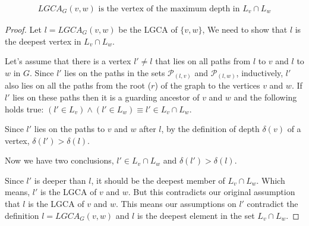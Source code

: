 \begin{theorem} \label{proofOfDeepness}
	\begin{gather*}
		LGCA_G(v,w) \text{ is the vertex of the maximum depth in } L_v\cap L_w
	\end{gather*}
\end{theorem}

\begin{proof}
	 Let $l = LGCA_G(v,w)$ be the LGCA of $\{v, w\}$, We need to show that $l$ is the deepest vertex in  $L_v \cap L_w$.


	Let's assume that there is a vertex $l' \neq l$ that lies on all paths from $l$ to $v$ and $l$ to $w$ in $G$.
	Since $l'$ lies on the paths in the sets $\mathcal{P}_{(l,v)}$ and $\mathcal{P}_{(l,w)}$, inductively, $l'$ also lies on all the paths from the root ($r$) of the graph to the vertices $v$ and $w$.
	If  $l'$ lies on these paths then it is a guarding ancestor of $v$ and $w$ and the following holds true: $(l' \in L_v) \land (l' \in L_w) \equiv l' \in L_v \cap L_w$.

	Since $l'$ lies on the paths to $v$ and $w$ after $l$, by the definition of depth $\delta(v)$ of a vertex,	$\delta(l') > \delta(l)$.

	Now we have two conclusions, $l' \in L_v \cap L_w$ and $\delta(l') > \delta(l)$.

	Since $l'$ is deeper than $l$, it should be the deepest member of  $ L_v \cap L_w$.
	Which means, $l'$ is the LGCA of $v$ and $w$.
	But this contradicts our original assumption that $l$ is the LGCA of $v$ and $w$.
	This means our assumptions on $l'$ contradict the definition $l = LGCA_G(v,w)$ and $l$ is the deepest element in the set $L_v \cap L_w$.
\end{proof}

